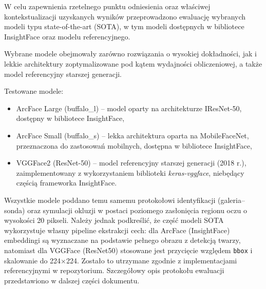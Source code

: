 W celu zapewnienia rzetelnego punktu odniesienia oraz właściwej kontekstualizacji uzyskanych wyników przeprowadzono ewaluację wybranych modeli typu state-of-the-art (SOTA), w tym modeli dostępnych w bibliotece InsightFace oraz modelu referencyjnego.

Wybrane modele obejmowały zarówno rozwiązania o wysokiej dokładności, jak i lekkie architektury zoptymalizowane pod kątem wydajności obliczeniowej, a także model referencyjny starszej generacji.

Testowane modele:
\begin{itemize}
\item ArcFace Large (buffalo\_l) – model oparty na architekturze IResNet-50, dostępny w bibliotece InsightFace,
\item ArcFace Small (buffalo\_s) – lekka architektura oparta na MobileFaceNet, przeznaczona do zastosowań mobilnych, dostępna w bibliotece InsightFace,
\item VGGFace2 (ResNet-50) – model referencyjny starszej generacji (2018 r.), zaimplementowany z wykorzystaniem biblioteki \textit{keras-vggface}, niebędący częścią frameworka InsightFace.
\end{itemize}

Wszystkie modele poddano temu samemu protokołowi identyfikacji (galeria–sonda) oraz symulacji okluzji w postaci poziomego zasłonięcia regionu oczu o wysokości 20 pikseli. Należy jednak podkreślić, że część modeli SOTA wykorzystuje własny pipeline ekstrakcji cech: dla ArcFace (InsightFace) embeddingi są wyznaczane na podstawie pełnego obrazu z detekcją twarzy, natomiast dla VGGFace (ResNet50) stosowane jest przycięcie względem \texttt{bbox} i skalowanie do 224×224. Zostało to utrzymane zgodnie z implementacjami referencyjnymi w repozytorium. Szczegółowy opis protokołu ewaluacji przedstawiono w dalszej części dokumentu.